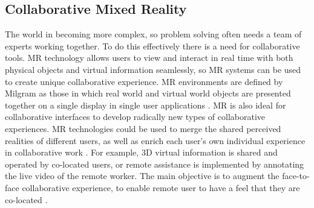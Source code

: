 \subsection{Collaborative Mixed Reality}
The world in becoming more complex, so problem solving often needs a team of experts working together. To do this effectively there is a need for collaborative tools.
MR technology allows users to view and interact in real time with both physical objects and virtual information seamlessly, so MR systems can be used to create unique collaborative experience. 
MR environments are defined by Milgram as those in which real world and virtual world objects are presented together on a single display in single user applications \cite{Milgram1994}. MR is also ideal for collaborative interfaces to develop radically new types of collaborative experiences. MR technologies could be used to merge the shared perceived realities of different users, as well as enrich each user's own individual experience in collaborative work \cite{Lukosch2015a}. 
For example, 3D virtual information is shared and operated by co-located users, or remote assistance is implemented by annotating the live video of the remote worker. The main objective is to augment the face-to-face collaborative experience, to enable remote user to have a feel that they are co-located \cite{Lukosch2015}. 

